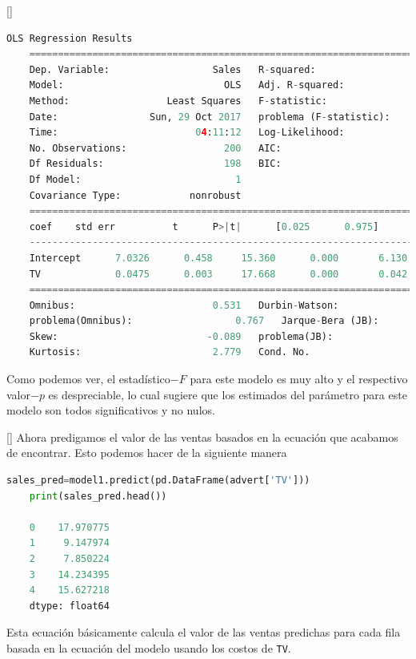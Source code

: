 []
\begin{lstlisting}[language=Python]
	OLS Regression Results
	==============================================================================
	Dep. Variable:                  Sales   R-squared:                       0.612
	Model:                            OLS   Adj. R-squared:                  0.610
	Method:                 Least Squares   F-statistic:                     312.1
	Date:                Sun, 29 Oct 2017   problema (F-statistic):           1.47e-42
	Time:                        04:11:12   Log-Likelihood:                -519.05
	No. Observations:                 200   AIC:                             1042.
	Df Residuals:                     198   BIC:                             1049.
	Df Model:                           1
	Covariance Type:            nonrobust
	==============================================================================
	coef    std err          t      P>|t|      [0.025      0.975]
	------------------------------------------------------------------------------
	Intercept      7.0326      0.458     15.360      0.000       6.130       7.935
	TV             0.0475      0.003     17.668      0.000       0.042       0.053
	==============================================================================
	Omnibus:                        0.531   Durbin-Watson:                   1.935
	problema(Omnibus):                  0.767   Jarque-Bera (JB):                0.669
	Skew:                          -0.089   problema(JB):                        0.716
	Kurtosis:                       2.779   Cond. No.                         338.
\end{lstlisting}



Como podemos ver, el estadístico$-F$ para este modelo es muy alto y el respectivo valor$-p$ es despreciable, lo cual sugiere que los estimados del parámetro para este modelo son todos significativos y no nulos.

[]{}
Ahora predigamos el valor de las ventas basados en la ecuación que acabamos de encontrar. Esto podemos hacer de la siguiente manera
\begin{lstlisting}[language=Python]
	sales_pred=model1.predict(pd.DataFrame(advert['TV']))
	print(sales_pred.head())
	
	0    17.970775
	1     9.147974
	2     7.850224
	3    14.234395
	4    15.627218
	dtype: float64
\end{lstlisting}



Esta ecuación básicamente calcula el valor de las ventas predichas para cada fila basada en la ecuación del modelo usando los costos de \texttt{TV}.

